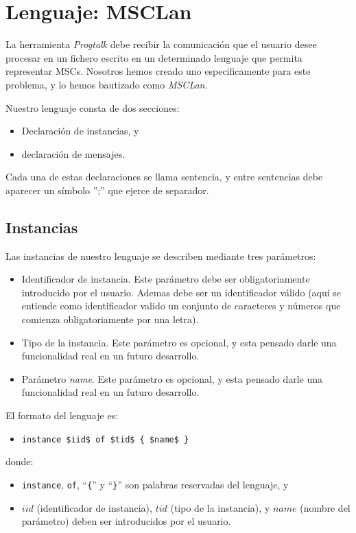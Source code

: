 \chapter{Lenguaje: MSCLan}
\label{ch:lenguaje}

La herramienta \textit{Progtalk} debe recibir la comunicación que el
usuario desee procesar en un fichero escrito en un determinado
lenguaje que permita representar MSCs. Nosotros hemos creado uno
especificamente para este problema, y lo hemos bautizado como
\textit{MSCLan}. 

Nuestro lenguaje consta de dos secciones:
\begin{itemize}
\item Declaración de instancias, y
\item declaración de mensajes.
\end{itemize}

Cada una de estas declaraciones se llama sentencia, y entre sentencias
debe aparecer un símbolo '';'' que ejerce de separador.

\section{Instancias}

Las instancias de nuestro lenguaje se describen mediante tres
parámetros:

\begin{itemize}
\item Identificador de instancia. Este parámetro debe ser
  obligatoriamente introducido por el usuario. Ademas debe ser un
  identificador válido (aquí se entiende como identificador valido un
  conjunto de caracteres y números que comienza obligatoriamente por
  una letra).
\item Tipo de la instancia. Este parámetro es opcional, y esta pensado
  darle una funcionalidad real en un futuro desarrollo.
\item Parámetro \textit{name}. Este parámetro es opcional, y esta
  pensado darle una funcionalidad real en un futuro desarrollo.
\end{itemize}

El formato del lenguaje es:

\begin{itemize}
\item \lstinline[mathescape]!instance $iid$ of $tid$ { $name$ }!
\end{itemize}
donde:
\begin{itemize}
\item \lstinline{instance}, \lstinline{of}, ``\lstinline!{!'' y
    ``\lstinline!}!'' son palabras reservadas del lenguaje, y
\item $iid$ (identificador de instancia), $tid$ (tipo de la
  instancia), y $name$ (nombre del parámetro) deben ser introducidos
  por el usuario.
\end{itemize}

